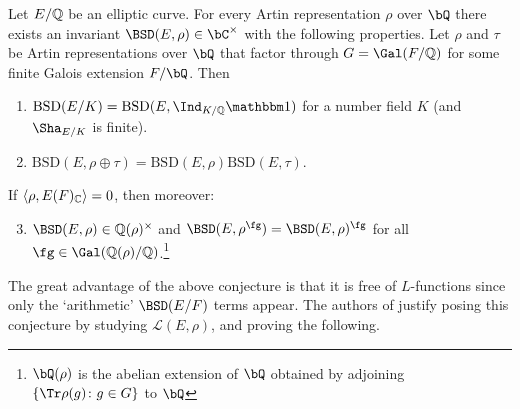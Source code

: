 \begin{conj}{\cite[Conjecture 4]{DEW1}}\label{conj_4}
    Let $E/\mathbb{Q}$ be an elliptic curve. 
    For every Artin representation $\rho$ over $\bQ$ there exists an invariant $\BSD(E, \rho) \in \bC^{\times}$ with the following properties. 
    Let $\rho$ and $\tau$ be Artin representations over $\bQ$ that factor through $G = \Gal(F/\QQ)$ for some finite Galois extension $F / \bQ$. Then 
    \begin{enumerate}[label={\bfseries C\arabic*.}]
        \setlength\itemsep{0em}
        \item $\mathrm{BSD}(E/K)=\mathrm{BSD}(E,\Ind_{K/\QQ}\trivial)$ for a number field $K$ (and $\Sha_{E/K}$ is finite).
        \item $\mathrm{BSD}(E,\rho\oplus\tau)=\mathrm{BSD}(E,\rho)\mathrm{BSD}(E,\tau)$.
    \end{enumerate}       
        If $\langle\rho,E(F)_{\mathbb{C}}\rangle=0$, then moreover:
    \begin{enumerate}[label={\bfseries C\arabic*.}]
        \setcounter{enumi}{2}
       \item $\BSD(E,\rho)\in\QQ(\rho)^{\times}$ and $\BSD(E,\rho^{\fg})=\BSD(E,\rho)^{\fg}$ for all $\fg\in\Gal(\QQ(\rho)/\QQ)$.\footnote{$\bQ(\rho)$ is the abelian extension of $\bQ$ obtained by adjoining $\{\Tr \rho (g) \colon g \in G \}$ to $\bQ$}
    \end{enumerate}
\end{conj}

The great advantage of the above conjecture is that it is free of $L$-functions since only the `arithmetic' $\BSD(E/F)$ terms appear. The authors of \cite{DEW1} justify posing this conjecture by studying $\mathcal{L}(E, \rho)$, and proving the following.

